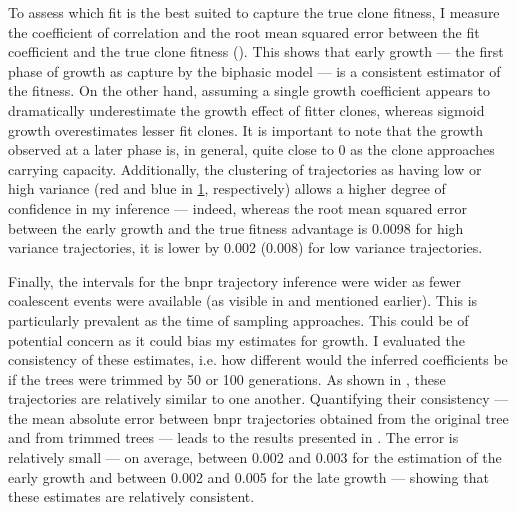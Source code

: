 To assess which fit is the best suited to capture the true clone fitness, I measure the coefficient of correlation and the root mean squared error between the fit coefficient and the true clone fitness (). This shows that early growth --- the first phase of growth as capture by the biphasic model --- is a consistent estimator of the fitness. On the other hand, assuming a single growth coefficient appears to dramatically underestimate the growth effect of fitter clones, whereas sigmoid growth overestimates lesser fit clones. It is important to note that the growth observed at a later phase is, in general, quite close to 0 as the clone approaches carrying capacity. Additionally, the clustering of trajectories as having low or high variance (red and blue in \ref{fig:benchmark-bnpr-fits}, respectively) allows a higher degree of confidence in my inference --- indeed, whereas the root mean squared error between the early growth and the true fitness advantage is 0.0098 for high variance trajectories, it is lower by 0.002 (0.008) for low variance trajectories. 

\begin{figure}[!ht]
	\label{fig:benchmark-bnpr-fits}
\end{figure}

Finally, the intervals for the \ac{bnpr} trajectory inference were wider as fewer coalescent events were available (as visible in  and mentioned earlier). This is particularly prevalent as the time of sampling approaches. This could be of potential concern as it could bias my estimates for growth. I evaluated the consistency of these estimates, i.e. how different would the inferred coefficients be if the trees were trimmed by 50 or 100 generations. As shown in , these trajectories are relatively similar to one another. Quantifying their consistency --- the mean absolute error between \ac{bnpr} trajectories obtained from the original tree and from trimmed trees --- leads to the results presented in . The error is relatively small --- on average, between 0.002 and 0.003 for the estimation of the early growth and between 0.002 and 0.005 for the late growth --- showing that these estimates are relatively consistent. 

\begin{figure}[!ht]
	\label{fig:examples-bnpr-fit-trimmed}
\end{figure}

